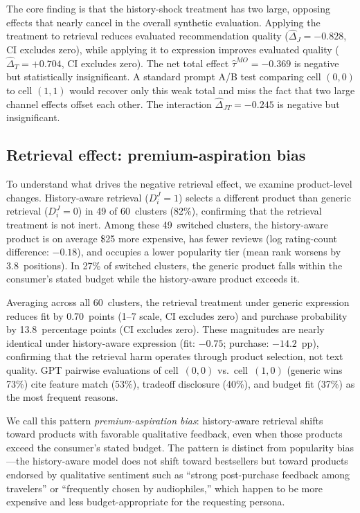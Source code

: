 \documentclass[11pt]{article}
\begin{document}
The core finding is that the history-shock treatment has two large, opposing effects that nearly cancel in the overall synthetic evaluation. Applying the treatment to retrieval reduces evaluated recommendation quality ($\hat{\Delta}_J = -0.828$, CI excludes zero), while applying it to expression improves evaluated quality ($\hat{\Delta}_T = +0.704$, CI excludes zero). The net total effect $\hat{\tau}^{MO} = -0.369$ is negative but statistically insignificant. A standard prompt A/B test comparing cell $(0,0)$ to cell $(1,1)$ would recover only this weak total and miss the fact that two large channel effects offset each other. The interaction $\hat{\Delta}_{JT} = -0.245$ is negative but insignificant.

\subsection{Retrieval effect: premium-aspiration bias}\label{section:retrieval-mechanism}

To understand what drives the negative retrieval effect, we examine product-level changes. History-aware retrieval ($D_i^J = 1$) selects a different product than generic retrieval ($D_i^J = 0$) in 49 of 60~clusters (82\%), confirming that the retrieval treatment is not inert. Among these 49~switched clusters, the history-aware product is on average \$25 more expensive, has fewer reviews (log rating-count difference: $-0.18$), and occupies a lower popularity tier (mean rank worsens by 3.8~positions). In 27\% of switched clusters, the generic product falls within the consumer's stated budget while the history-aware product exceeds it.

Averaging across all 60~clusters, the retrieval treatment under generic expression reduces fit by 0.70~points (1--7 scale, CI excludes zero) and purchase probability by 13.8~percentage points (CI excludes zero). These magnitudes are nearly identical under history-aware expression (fit: $-0.75$; purchase: $-14.2$~pp), confirming that the retrieval harm operates through product selection, not text quality. GPT pairwise evaluations of cell~$(0,0)$ vs.\ cell~$(1,0)$ (generic wins 73\%) cite feature match (53\%), tradeoff disclosure (40\%), and budget fit (37\%) as the most frequent reasons.

We call this pattern \emph{premium-aspiration bias}: history-aware retrieval shifts toward products with favorable qualitative feedback, even when those products exceed the consumer's stated budget. The pattern is distinct from popularity bias---the history-aware model does not shift toward bestsellers but toward products endorsed by qualitative sentiment such as ``strong post-purchase feedback among travelers'' or ``frequently chosen by audiophiles,'' which happen to be more expensive and less budget-appropriate for the requesting persona.
\end{document}

